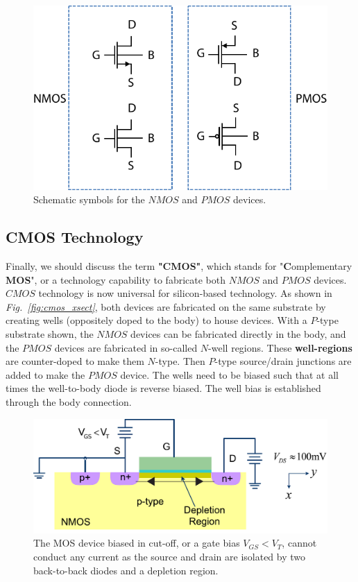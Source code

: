 \begin{figure}[H]
\centering
\includegraphics[width=.6\columnwidth]{mos_symbols}
\caption{Schematic symbols for the $NMOS$ and $PMOS$ devices.}
\label{fig:mos_symbols}
\end{figure}
\subsection{CMOS Technology}
Finally, we should discuss the term \textbf{"CMOS"}, which stands for "\textbf{C}omplementary \textbf{MOS}", or a technology capability to fabricate both $NMOS$ and $PMOS$ devices.  $CMOS$ technology is now universal for silicon-based technology.  As shown in \emph{Fig.~\ref{fig:cmos_xsect}}, both devices are fabricated on the same substrate by creating wells (oppositely doped to the body) to house devices.  With a $P$-type substrate shown, the $NMOS$ devices can be fabricated directly in the body, and the $PMOS$ devices are fabricated in so-called $N$-well regions.  These \textbf{well-regions} are counter-doped to make them $N$-type.  Then $P$-type source/drain junctions are added to make the $PMOS$ device.  The wells need to be biased such that at all times the well-to-body diode is reverse biased.  The well bias is established through the body connection.
\begin{figure}[t]
\centering
\includegraphics[width=.75\columnwidth]{mos_cutoff}
\caption{The MOS device biased in cut-off, or a gate bias $V_{GS} < V_T$, cannot conduct any current as the source and drain are isolated by two back-to-back diodes and a depletion region.}
\label{fig:mos_cutoff}
\end{figure}
